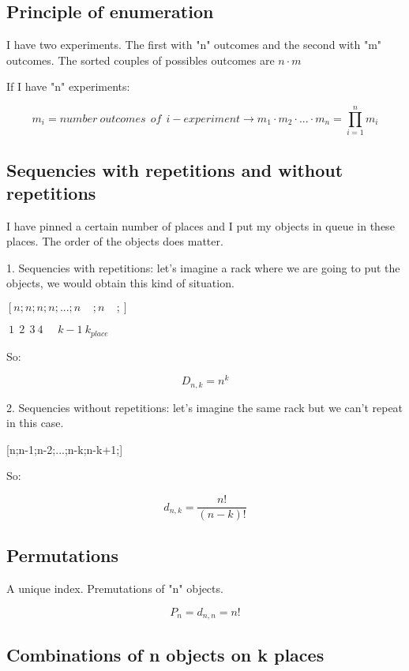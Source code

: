 \documentclass{article}
\begin{document}
\subsection{Principle of enumeration}

I have two experiments. The first with "n" outcomes and the second with "m" outcomes. The sorted couples of possibles outcomes are $n \cdot m$

If I have "n" experiments:

$$m_i = number  \ outcomes \ \ of \ \ i-experiment \longrightarrow m_1 \cdot m_2 \cdot ... \cdot m_n = \prod_{i=1}^n m_i$$

\subsection{Sequencies with repetitions and without repetitions}

I have pinned a certain number of places and I put my objects in queue in these places. The order of the objects does matter.

1. Sequencies with repetitions: let's imagine a rack where we are going to put the objects, we would obtain this kind of situation.

$[n;n;n;n;...;n \ \ \ \ \ ;n \ \ \ \ \ ;]$
 
$\ 1 \ \  2  \ \  3 \ 4 \ \ \ \ \ \ k-1 \  k_{place} $

\bigskip

So:

$$D_{n,k} = n^k$$

2. Sequencies without repetitions: let's imagine the same rack but we can't repeat in this case.

[n;n-1;n-2;...;n-k;n-k+1;]

\bigskip

So:

$$d_{n,k} = \frac{n!}{(n-k)!}$$


\subsection{Permutations}

A unique index. Premutations of "n" objects.

$$P_n = d_{n,n} = n!$$

\subsection{Combinations of n objects on k places}
\end{document}
